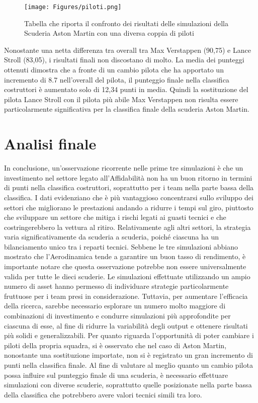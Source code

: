 \begin{figure}[h]
    \centering
    \texttt{[image: Figures/piloti.png]}
    \caption{Tabella che riporta il confronto dei risultati delle simulazioni della Scuderia Aston Martin con una diversa coppia di piloti}
    \label{fig:figura9_9}
\end{figure}

Nonostante una netta differenza tra overall tra Max Verstappen (90,75) e Lance Stroll (83,05), i risultati finali non discostano di molto. La media dei punteggi ottenuti dimostra che a fronte di un cambio pilota che ha apportato un incremento di 8.7 nell’overall del pilota, il punteggio finale nella classifica costruttori è aumentato solo di 12,34 punti in media. Quindi la sostituzione del pilota Lance Stroll con il pilota più abile Max Verstappen non risulta essere particolarmente significativa per la classifica finale della scuderia Aston Martin.

\newpage

\section{Analisi finale}

In conclusione, un’osservazione ricorrente nelle prime tre simulazioni è che un investimento nel settore legato all’Affidabilità non ha un buon ritorno in termini di punti nella classifica costruttori, soprattutto per i team nella parte bassa della classifica. I dati evidenziano che è più vantaggioso concentrarsi sullo sviluppo dei settori che migliorano le prestazioni andando a ridurre i tempi sul giro, piuttosto che sviluppare un settore che mitiga i rischi legati ai guasti tecnici e che costringerebbero la vettura al ritiro. Relativamente agli altri settori, la strategia varia significativamente da scuderia a scuderia, poiché ciascuna ha un bilanciamento unico tra i reparti tecnici. Sebbene le tre simulazioni abbiano mostrato che l’Aerodinamica tende a garantire un buon tasso di rendimento, è importante notare che questa osservazione potrebbe non essere universalmente valida per tutte le dieci scuderie. Le simulazioni effettuate utilizzando un ampio numero di asset hanno permesso di individuare strategie particolarmente fruttuose per i team presi in considerazione. Tuttavia, per aumentare l'efficacia della ricerca, sarebbe necessario esplorare un numero molto maggiore di combinazioni di investimento e condurre simulazioni più approfondite per ciascuna di esse, al fine di ridurre la variabilità degli output e ottenere risultati più solidi e generalizzabili. Per quanto riguarda l’opportunità di poter cambiare i piloti della propria squadra, si è osservato che nel caso di Aston Martin, nonostante una sostituzione importate, non si è registrato un gran incremento di punti nella classifica finale. Al fine di valutare al meglio quanto un cambio pilota possa influire sul punteggio finale di una scuderia, è necessario effettuare simulazioni con diverse scuderie, soprattutto quelle posizionate nella parte bassa della classifica che potrebbero avere valori tecnici simili tra loro.






